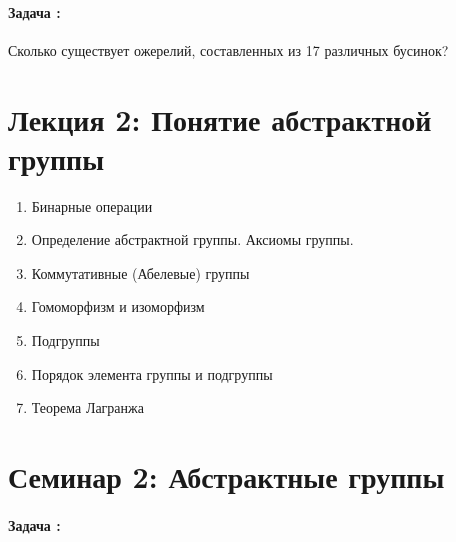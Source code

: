 \documentclass[amsmath,amssymb,12pt]{revtex4}
\newif\ifimportant
\newcommand{\1}{\frac{1}{2}}
\begin{document}
\addtocounter{prn}{1}
\vspace{0.3cm}
\paragraph*{Задача \theprn: }

Сколько существует ожерелий, составленных из 17 различных бусинок? 
\ifimportant
\medskip
\noindent
Решение
17 предметов можно расставить по кругу 16! способами (см. задачу 60373). Но ожерелье можно еще и перевернуть, что сокращает число способов вдвое.

Ответ
16!/2. 
\fi






\newpage
\section*{\large Лекция 2: Понятие абстрактной группы}
%
\setcounter{prn}{0}


\begin{enumerate}
	\item Бинарные операции
	\item Определение абстрактной группы. Аксиомы группы.
	\item Коммутативные (Абелевые) группы
	\item Гомоморфизм и изоморфизм
	\item Подгруппы
	\item Порядок элемента группы и подгруппы
	\item Теорема Лагранжа
\end{enumerate}


\newpage
\section*{\large Семинар 2: Абстрактные группы}
\setcounter{prn}{0}

\addtocounter{prn}{1}
\vspace{0.3cm}
\paragraph*{Задача \theprn: }
\end{document}

